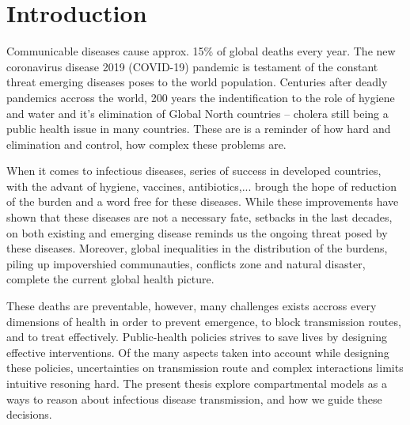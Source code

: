 \chapter{Introduction} %
 
 Communicable diseases cause approx. 15\% of global deaths\cite[][Table 1, excl. non- transmissible neonatal and maternal diseases and nutritional diseases; pre-COVID-19 estimates]{Roth:GlobalRegionalNational:2018} every year. The new coronavirus disease 2019 (COVID-19) pandemic is testament of the constant threat emerging diseases poses to the world population. Centuries after deadly pandemics accross the world, 200 years the indentification to the role of hygiene and water and it's elimination of Global North countries --  cholera still being a public health issue in many countries. These are is a reminder of how hard and elimination and control, how complex these problems are.
 
 When it comes to infectious diseases, series of success in developed countries, with the advant of hygiene, vaccines, antibiotics,... brough the hope of reduction of the burden and a word free for these diseases. While these improvements have shown that these diseases are not a necessary fate, setbacks in the last decades, on both existing and emerging disease reminds us the ongoing threat posed by these diseases. Moreover, global inequalities in the distribution of the burdens, piling up impovershied communauties, conflicts zone and natural disaster, complete the current global health picture.
 
 These deaths are preventable, however, many challenges exists accross every dimensions of health in order to prevent emergence, to block transmission routes, and to treat effectively. Public-health policies strives to save lives by designing effective interventions. Of the many aspects taken into account while designing these policies, uncertainties on transmission route and complex interactions limits intuitive resoning hard. The present thesis explore compartmental models as a ways to reason about infectious disease transmission, and how we guide these decisions.
  
